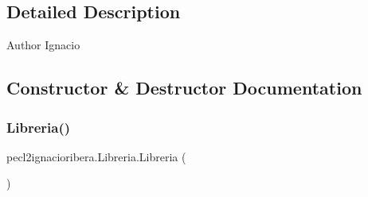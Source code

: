 \subsection{Detailed Description}
\begin{DoxyAuthor}{Author}
Ignacio 
\end{DoxyAuthor}


\subsection{Constructor \& Destructor Documentation}
\mbox{\label{classpecl2ignacioribera_1_1_libreria_afb8a78e297254074dcc5c35d5c5e00e9}} 
\subsubsection{\texorpdfstring{Libreria()}{Libreria()}}
{\footnotesize\ttfamily pecl2ignacioribera.\+Libreria.\+Libreria (\begin{DoxyParamCaption}{ }\end{DoxyParamCaption})\hspace{0.3cm}{\ttfamily [inline]}}

